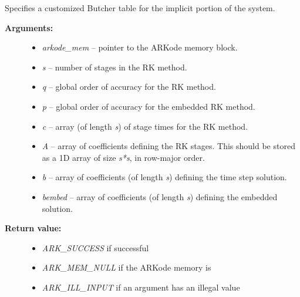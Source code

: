 \documentclass[letterpaper,10pt,english]{sphinxmanual}
\begin{document}
\begin{fulllineitems}
\label{c_interface/User_callable:ARKodeSetIRKTable}
Specifies a customized Butcher table for the implicit portion of the system.
\begin{description}
\item[{\textbf{Arguments:}}] \leavevmode\begin{itemize}
\item {} 
\emph{arkode\_mem} -- pointer to the ARKode memory block.

\item {} 
\emph{s} -- number of stages in the RK method.

\item {} 
\emph{q} -- global order of accuracy for the RK method.

\item {} 
\emph{p} -- global order of accuracy for the embedded RK method.

\item {} 
\emph{c} -- array (of length \emph{s}) of stage times for the RK method.

\item {} 
\emph{A} -- array of coefficients defining the RK stages.  This should
be stored as a 1D array of size \emph{s*s}, in row-major order.

\item {} 
\emph{b} -- array of coefficients (of length \emph{s}) defining the time step solution.

\item {} 
\emph{bembed} -- array of coefficients (of length \emph{s}) defining the embedded solution.

\end{itemize}

\item[{\textbf{Return value:}}] \leavevmode\begin{itemize}
\item {} 
\emph{ARK\_SUCCESS} if successful

\item {} 
\emph{ARK\_MEM\_NULL} if the ARKode memory is 

\item {} 
\emph{ARK\_ILL\_INPUT} if an argument has an illegal value


\end{itemize}
\end{description}
\end{fulllineitems}
\end{document}
